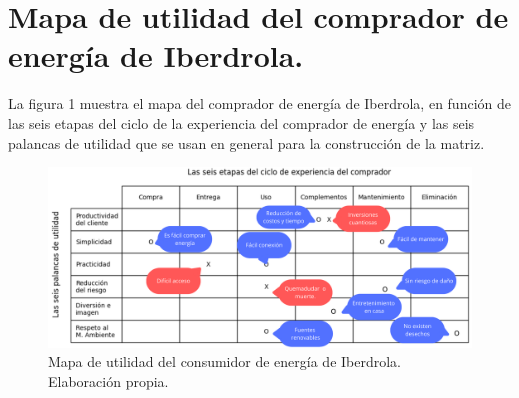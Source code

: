 \documentclass{article}
\begin{document}
\section{Mapa de utilidad del comprador de energía de Iberdrola.}
La figura 1 muestra el mapa del comprador de energía de Iberdrola, en función de las seis etapas del ciclo de la experiencia del comprador de energía y las seis palancas de utilidad que se usan en general para la construcción de la matriz. 
\begin{figure}[h!]  %
    \centering
    \includegraphics[width=1\textwidth]{Mapa de utilidad.png}  %
    \caption{Mapa de utilidad del consumidor de energía de Iberdrola. Elaboración propia.}
    \label{fig:mi_imagen}
\end{figure}
\end{document}
